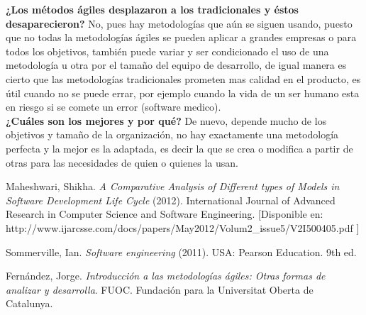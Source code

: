 \documentclass[spanish,12pt,letterpapper]{article}
\begin{document}
    \textbf{¿Los métodos ágiles desplazaron a los tradicionales y éstos desaparecieron?}
    No, pues hay metodologías que aún se siguen usando, puesto que no todas la metodologías ágiles se pueden aplicar a grandes empresas o para todos los objetivos, también puede variar y ser condicionado el uso de una metodología u otra por el tamaño del equipo de desarrollo, de igual manera es cierto que las metodologías tradicionales prometen mas calidad en el producto, es útil cuando no se puede errar, por ejemplo cuando la vida de un ser humano esta en riesgo si se comete un error (software medico).\\
    
    \textbf{¿Cuáles son los mejores y por qué?} 
    De nuevo, depende mucho de los objetivos y tamaño de la organización, no hay exactamente una metodología perfecta y la mejor es la adaptada, es decir la que se crea o modifica a partir de otras para las necesidades de quien o quienes la usan.
	
	\pagebreak
	\begin{thebibliography}{9}
	  Maheshwari, Shikha. 
		\emph{A Comparative Analysis of Different types of Models in Software Development Life Cycle} (2012). International Journal of Advanced Research in Computer Science and Software Engineering. [Disponible en: http://www.ijarcsse.com/docs/papers/May2012/Volum2\_issue5/V2I500405.pdf ]
		
		  Sommerville, Ian. 
		\emph{Software engineering} (2011). USA:  Pearson Education. 9th ed. 
		
		  Fernández, Jorge. 
		\emph{Introducción a las metodologías ágiles: Otras formas de analizar y desarrolla}. FUOC. Fundación para la Universitat Oberta de Catalunya. 
		
	\end{thebibliography}
	
\end{document}
